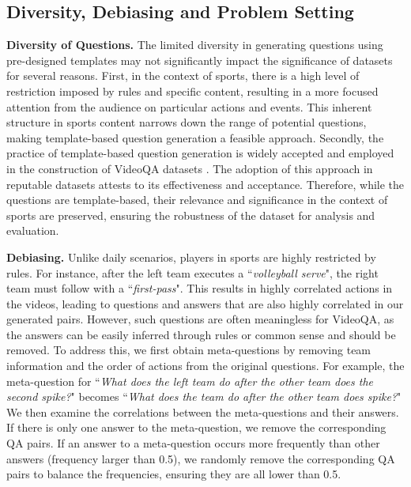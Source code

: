 {\subsection{Diversity, Debiasing and Problem Setting}

\noindent \textbf{Diversity of Questions.} The limited diversity in generating questions using pre-designed templates may not significantly impact the significance of datasets for several reasons. First, in the context of sports, there is a high level of restriction imposed by rules and specific content, resulting in a more focused attention from the audience on particular actions and events. This inherent structure in sports content narrows down the range of potential questions, making template-based question generation a feasible approach.
Secondly, the practice of template-based question generation is widely accepted and employed in the construction of VideoQA datasets \citep{jang2017tgif, xu2017video, yang2021just}. 
The adoption of this approach in reputable datasets attests to its effectiveness and acceptance. Therefore, while the questions are template-based, their relevance and significance in the context of sports are preserved, ensuring the robustness of the dataset for analysis and evaluation.





\noindent \textbf{Debiasing.} Unlike daily scenarios, players in sports are highly restricted by rules. For instance, after the left team executes a ``\textit{volleyball serve}", the right team must follow with a ``\textit{first-pass}". This results in highly correlated actions in the videos, leading to questions and answers that are also highly correlated in our generated pairs. However, such questions are often meaningless for VideoQA, as the answers can be easily inferred through rules or common sense and should be removed.
To address this, we first obtain meta-questions by removing team information and the order of actions from the original questions. For example, the meta-question for ``\textit{What does the left team do after the other team does the second spike?}" becomes ``\textit{What does the team do after the other team does spike?}" We then examine the correlations between the meta-questions and their answers. If there is only one answer to the meta-question, we remove the corresponding QA pairs. If an answer to a meta-question occurs more frequently than other answers (frequency larger than 0.5), we randomly remove the corresponding QA pairs to balance the frequencies, ensuring they are all lower than 0.5.

}
